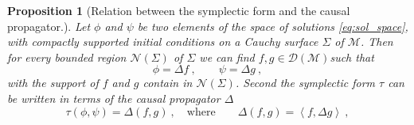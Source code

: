\documentclass[11pt]{book}
\newcommand{\sm}[1]{\left\langle#1\right\rangle}
\newcommand{\Dcal}{\mathcal{D}}
\newcommand{\Mcal}{\mathcal{M}}
\newcommand{\Ncal}{\mathcal{N}}
\theoremstyle{break}
\newtheorem{proposition}{Proposition}[chapter]
\begin{document}
\begin{proposition}[Relation between the symplectic form and the causal propagator.]
Let $\phi$ and $\psi$ be two elements of the space of solutions \eqref{eq:sol_space}, with compactly supported initial conditions on a Cauchy surface $\Sigma$ of $\Mcal$. Then for every bounded region $\Ncal(\Sigma)$ of $\Sigma$ we can find $f,g \in \Dcal(\Mcal)$such that
%
\begin{equation*}
\phi = \Delta f \ , \qquad  \psi   =  \Delta g \ ,
\end{equation*}
%
with the support of $f$ and $g$ contain in $\Ncal(\Sigma)$. Second the symplectic form $\tau$ can be written in terms of the causal propagator $\Delta$ 
%
\begin{equation*}
\tau(\phi,\psi) = \Delta(f,g) \ , \quad \mbox{where} \qquad \Delta(f,g) = \sm{f,\Delta g} \ ,
\end{equation*}
%
\end{proposition}
\end{document}
